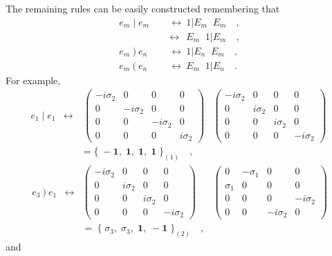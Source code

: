 \documentclass[a4paper,12pt]{book}
\begin{document}
The remaining rules can be easily constructed remembering that 
\begin{eqnarray*}
{e_{m}\mid e_{m}} &&~~\leftrightarrow ~1|E_{m}\;\;E_{m}\quad , \\
&&~\leftrightarrow ~~E_{m}\;\;1|E_{m}\quad , \\
{e_{m}~\mathbf{)}~e_{n}} &&~~\leftrightarrow ~1|E_{n}\;\;E_{m}\quad , \\
{e_{m}~\mathbf{(}~e_{n}} &&~~\leftrightarrow ~E_{m}\;\;1|E_{n}\quad .
\end{eqnarray*}
For example, 
\[
\begin{array}{llll}
{e_{1}\mid e_{1}} & \leftrightarrow & ~\left( 
\begin{array}{cccc}
-i\sigma _{2} & 0 & 0 & 0 \\ 
0 & -i\sigma _{2} & 0 & 0 \\ 
0 & 0 & -i\sigma _{2} & 0 \\ 
0 & 0 & 0 & i\sigma _{2}
\end{array}
\right) & \left( 
\begin{array}{cccc}
-i\sigma _{2} & 0 & 0 & 0 \\ 
0 & i\sigma _{2} & 0 & 0 \\ 
0 & 0 & i\sigma _{2} & 0 \\ 
0 & 0 & 0 & -i\sigma _{2}
\end{array}
\right) \\ 
&  & =\{\;-\mathbf{1},\;\mathbf{1},\;\mathbf{1},\;\mathbf{1}\;\}_{(1)}\quad ,
& 
\end{array}
~ 
\]
\[
\begin{array}{llll}
{e_{3}~\mathbf{)}~e_{1}} & \leftrightarrow & \left( 
\begin{array}{cccc}
-i\sigma _{2} & 0 & 0 & 0 \\ 
0 & i\sigma _{2} & 0 & 0 \\ 
0 & 0 & i\sigma _{2} & 0 \\ 
0 & 0 & 0 & -i\sigma _{2}
\end{array}
\right) & \left( 
\begin{array}{cccc}
0 & -\sigma _{1} & 0 & 0 \\ 
\sigma _{1} & 0 & 0 & 0 \\ 
0 & 0 & 0 & -i\sigma _{2} \\ 
0 & 0 & -i\sigma _{2} & 0
\end{array}
\right) \\ 
&  & =~\{\;\sigma _{3},\;\sigma _{3},\;\mathbf{1},\;-\mathbf{1}%
\;\}_{(2)}\quad , & 
\end{array}
\]
and 
\end{document}
